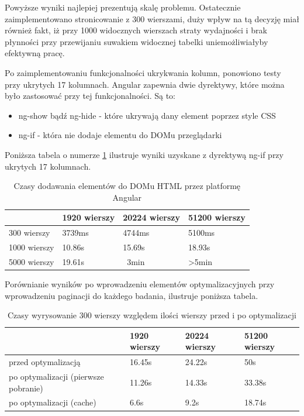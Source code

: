 \documentclass[a4paper,12pt,twoside]{article}
\begin{document}
Powyższe wyniki najlepiej prezentują skalę problemu. Ostatecznie zaimplementowano
stronicowanie z 300 wierszami, duży wpływ na tą decyzję miał również fakt, iż
przy 1000 widocznych wierszach straty wydajności i brak płynności przy przewijaniu
suwakiem widocznej tabelki uniemożliwiałyby efektywną pracę.

Po zaimplementowaniu funkcjonalności ukrykwania kolumn, ponowiono testy przy ukrytych 17 kolumnach. Angular zapewnia dwie dyrektywy, które można było zastosować przy tej funkcjonalności. Są to:
\begin{itemize}
\item ng-show bądź ng-hide - które ukrywają dany element poprzez style CSS
\item ng-if - która nie dodaje elementu do DOMu przeglądarki
\end{itemize}

Poniższa tabela o numerze \ref{table:tableRenderNgIf} ilustruje wyniki uzyskane z dyrektywą ng-if przy ukrytych 17 kolumnach.
\begin{table} [H]
\begin{tabular}{| p{3cm} | p{3cm} | p{3cm} | p{3cm}|}
\hline
& 1920 wierszy &  20224 wierszy & 51200 wierszy\\ 
\hline
300 wierszy& 3739ms& 4744ms& 5100ms\\ \hline  
1000 wierszy& 10.86s & 15.69s& 18.93s\\ \hline  
5000 wierszy& 19.61s& ~3min& >5min\\ \hline  
\end{tabular}
\caption{Czasy dodawania elementów do DOMu HTML przez platformę Angular}
\label{table:tableRenderNgIf}
\end{table}

Porównianie wyników po wprowadzeniu elementów optymalizacyjnych przy
wprowadzeniu paginacji do każdego badania, ilustruje poniższa
tabela. 

\begin{table} [H]
\begin{tabular}{| p{3cm} | p{3cm} | p{3cm} | p{3cm}|}
\hline
& 1920 wierszy &  20224 wierszy & 51200 wierszy\\ 
\hline
przed optymalizacją& 16.45s& 24.22s& 50s\\ \hline  
po optymalizacji (pierwsze pobranie)& 11.26s & 14.33s&  33.38s\\ \hline  
po optymalizacji (cache)& 6.6s& 9.2s& 18.74s\\ \hline  
\end{tabular}
\caption{Czasy wyrysowanie 300 wierszy względem ilości wierszy przed i po optymalizacji}
\label{table:summaryRender}
\end{table}
\end{document}
